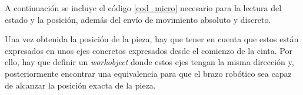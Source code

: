 A continuación se incluye el código \ref{cod_micro} necesario para la lectura del estado y la posición, además del envío
de movimiento absoluto y discreto.



Una vez obtenida la posición de la pieza, hay que tener en cuenta que estos están expresados en unos ejes 
concretos expresados desde el comienzo de la cinta. Por ello, hay que definir un \emph{workobject} donde 
estos ejes tengan la misma dirección y, posteriormente encontrar una equivalencia para que el brazo 
robótico sea capaz de alcanzar la posición exacta de la pieza.